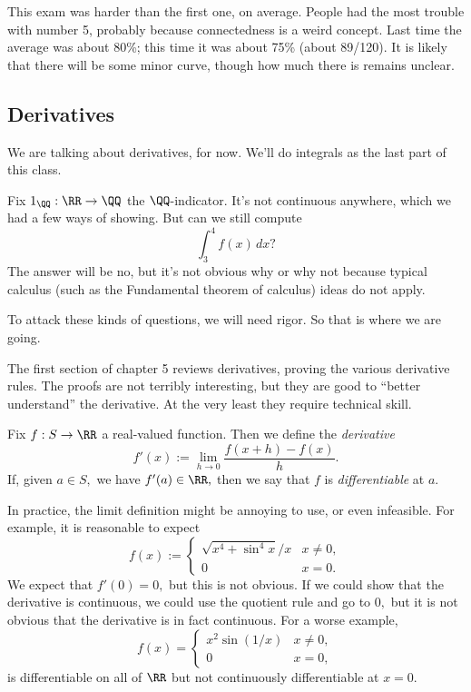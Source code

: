 This exam was harder than the first one, on average. People had the most trouble with number 5, probably because connectedness is a weird concept. Last time the average was about 80\%; this time it was about 75\% (about 89/120). It is likely that there will be some minor curve, though how much there is remains unclear.

\subsection{Derivatives}
We are talking about derivatives, for now. We'll do integrals as the last part of this class.
\begin{ex}
	Fix $1_\QQ:\RR\to\QQ$ the $\QQ$-indicator. It's not continuous anywhere, which we had a few ways of showing. But can we still compute
	\[\int_3^4f(x)\,dx?\]
	The answer will be no, but it's not obvious why or why not because typical calculus (such as the Fundamental theorem of calculus) ideas do not apply.
\end{ex}
To attack these kinds of questions, we will need rigor. So that is where we are going.

The first section of chapter 5 reviews derivatives, proving the various derivative rules. The proofs are not terribly interesting, but they are good to ``better understand'' the derivative. At the very least they require technical skill.
\begin{definition}[Derivative]
	Fix $f:S\to\RR$ a real-valued function. Then we define the \textit{derivative}
	\[f'(x):=\lim_{h\to0}\frac{f(x+h)-f(x)}h.\]
	If, given $a\in S,$ we have $f'(a)\in\RR,$ then we say that $f$ is \textit{differentiable} at $a.$
\end{definition}
In practice, the limit definition might be annoying to use, or even infeasible. For example, it is reasonable to expect
\[f(x):=\begin{cases}
	\sqrt{x^4+\sin^4x}/x & x\ne0, \\
	0 & x=0.
\end{cases}\]
We expect that $f'(0)=0,$ but this is not obvious. If we could show that the derivative is continuous, we could use the quotient rule and go to $0,$ but it is not obvious that the derivative is in fact continuous. For a worse example,
\[f(x)=\begin{cases}
	x^2\sin(1/x) & x\ne0, \\
	0 & x=0,
\end{cases}\]
is differentiable on all of $\RR$ but not continuously differentiable at $x=0.$

